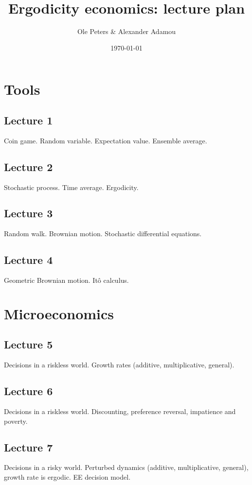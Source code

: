 \documentclass[12pt,a4paper]{article}
\begin{document}
\title{Ergodicity economics: lecture plan}
\author{Ole Peters \& Alexander Adamou}
\date{\today}
\maketitle

\section*{Tools}
\subsection*{Lecture 1}
Coin game. Random variable. Expectation value. Ensemble average.

\subsection*{Lecture 2}
Stochastic process. Time average. Ergodicity.

\subsection*{Lecture 3}
Random walk. Brownian motion. Stochastic differential equations.

\subsection*{Lecture 4}
Geometric Brownian motion. It\^{o} calculus.

\section*{Microeconomics}
\subsection*{Lecture 5}
Decisions in a riskless world.
Growth rates (additive, multiplicative, general).

\subsection*{Lecture 6}
Decisions in a riskless world.
Discounting, preference reversal, impatience and poverty.

\subsection*{Lecture 7}
Decisions in a risky world.
Perturbed dynamics (additive, multiplicative, general), growth rate is ergodic. EE decision model.
\end{document}
